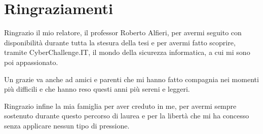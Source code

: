 \chapter*{Ringraziamenti}
Ringrazio il mio relatore, il professor Roberto Alfieri, per avermi seguito con disponibilità durante tutta la stesura della tesi e per avermi fatto scoprire, tramite CyberChallenge.IT, il mondo della sicurezza informatica, a cui mi sono poi appassionato.

Un grazie va anche ad amici e parenti che mi hanno fatto compagnia nei momenti più difficili e che hanno reso questi anni più sereni e leggeri.

Ringrazio infine la mia famiglia per aver creduto in me, per avermi sempre sostenuto durante questo percorso di laurea e per la libertà che mi ha concesso senza applicare nessun tipo di pressione.
